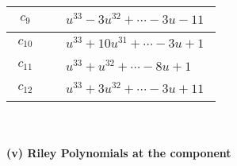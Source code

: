 \documentclass[1p]{elsarticle_modified}
\theoremstyle{definition}
\begin{document}
\begin{tabular}{m{50pt}|m{274pt}}
\hline $$\begin{aligned}c_{9}\end{aligned}$$&$\begin{aligned}
&u^{33}-3 u^{32}+\cdots-3 u-11
\end{aligned}$\\
\hline $$\begin{aligned}c_{10}\end{aligned}$$&$\begin{aligned}
&u^{33}+10 u^{31}+\cdots-3 u+1
\end{aligned}$\\
\hline $$\begin{aligned}c_{11}\end{aligned}$$&$\begin{aligned}
&u^{33}+u^{32}+\cdots-8 u+1
\end{aligned}$\\
\hline $$\begin{aligned}c_{12}\end{aligned}$$&$\begin{aligned}
&u^{33}+3 u^{32}+\cdots-3 u+11
\end{aligned}$\\
\hline
\end{tabular}\\~\\
\newpage\renewcommand{\arraystretch}{1}
\flushleft \textbf{(v) Riley Polynomials at the component}\newline \\
\end{document}
